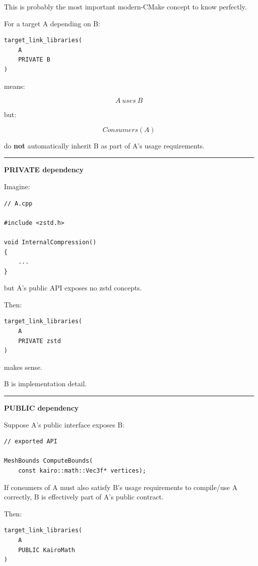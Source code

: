 This is probably the most important modern-CMake concept to know perfectly.

For a target A depending on B:

\begin{verbatim}
target_link_libraries(
    A
    PRIVATE B
)
\end{verbatim}

means:

\[
A\ uses\ B
\]

but:

\[
Consumers(A)
\]

do \textbf{not} automatically inherit B as part of A's usage requirements.

\begin{center}\rule{0.5\linewidth}{0.5pt}\end{center}

\textbf{PRIVATE dependency}

Imagine:

\begin{verbatim}
// A.cpp

#include <zstd.h>

void InternalCompression()
{
    ...
}
\end{verbatim}

but A's public API exposes no zstd concepts.

Then:

\begin{verbatim}
target_link_libraries(
    A
    PRIVATE zstd
)
\end{verbatim}

makes sense.

B is implementation detail.

\begin{center}\rule{0.5\linewidth}{0.5pt}\end{center}

\textbf{PUBLIC dependency}

Suppose A's public interface exposes B:

\begin{verbatim}
// exported API

MeshBounds ComputeBounds(
    const kairo::math::Vec3f* vertices);
\end{verbatim}

If consumers of A must also satisfy B's usage requirements to compile/use A correctly, B is effectively part of A's public contract.

Then:

\begin{verbatim}
target_link_libraries(
    A
    PUBLIC KairoMath
)
\end{verbatim}

